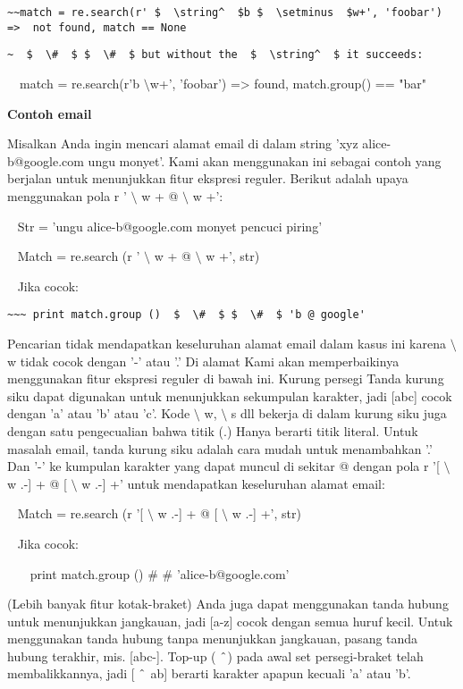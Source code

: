 \begin {enumerate}
\begin {enumerate}
\verb|~~match = re.search(r' $  \string^  $b $  \setminus  $w+', 'foobar') =>  not found, match == None|

\verb|~  $  \#  $ $  \#  $ but without the  $  \string^  $ it succeeds:|

~~match = re.search(r'b $  \setminus  $w+', 'foobar') =>  found, match.group() == "bar"

{\fontsize{14pt}{14pt}\selectfont \textbf{Contoh email} \\} \par
Misalkan Anda ingin mencari alamat email di dalam string 'xyz alice-b@google.com ungu monyet'. Kami akan menggunakan ini sebagai contoh yang berjalan untuk menunjukkan fitur ekspresi reguler. Berikut adalah upaya menggunakan pola r ' $  \setminus  $ w + @  $  \setminus  $ w +':

~ Str = 'ungu alice-b@google.com monyet pencuci piring'

~ Match = re.search (r ' $  \setminus  $ w + @  $  \setminus  $ w +', str)

~ Jika cocok:

\verb|~~~ print match.group ()  $  \#  $ $  \#  $ 'b @ google'|

Pencarian tidak mendapatkan keseluruhan alamat email dalam kasus ini karena  $  \setminus  $ w tidak cocok dengan '-' atau '.' Di alamat Kami akan memperbaikinya menggunakan fitur ekspresi reguler di bawah ini. Kurung persegi Tanda kurung siku dapat digunakan untuk menunjukkan sekumpulan karakter, jadi [abc] cocok dengan 'a' atau 'b' atau 'c'. Kode  $  \setminus  $ w,  $  \setminus  $ s dll bekerja di dalam kurung siku juga dengan satu pengecualian bahwa titik (.) Hanya berarti titik literal. Untuk masalah email, tanda kurung siku adalah cara mudah untuk menambahkan '.' Dan '-' ke kumpulan karakter yang dapat muncul di sekitar @ dengan pola r '[ $  \setminus  $ w .-] + @ [ $  \setminus  $ w .-] +' untuk mendapatkan keseluruhan alamat email:

~ Match = re.search (r '[ $  \setminus  $ w .-] + @ [ $  \setminus  $ w .-] +', str)

~ Jika cocok:

~~~ print match.group ()  $  \#  $ $  \#  $ 'alice-b@google.com'

(Lebih banyak fitur kotak-braket) Anda juga dapat menggunakan tanda hubung untuk menunjukkan jangkauan, jadi [a-z] cocok dengan semua huruf kecil. Untuk menggunakan tanda hubung tanpa menunjukkan jangkauan, pasang tanda hubung terakhir, mis. [abc-]. Top-up ( $  \string^  $) pada awal set persegi-braket telah membalikkannya, jadi [ $  \string^  $ ab] berarti karakter apapun kecuali 'a' atau 'b'.


\end{enumerate}
\end{enumerate}
